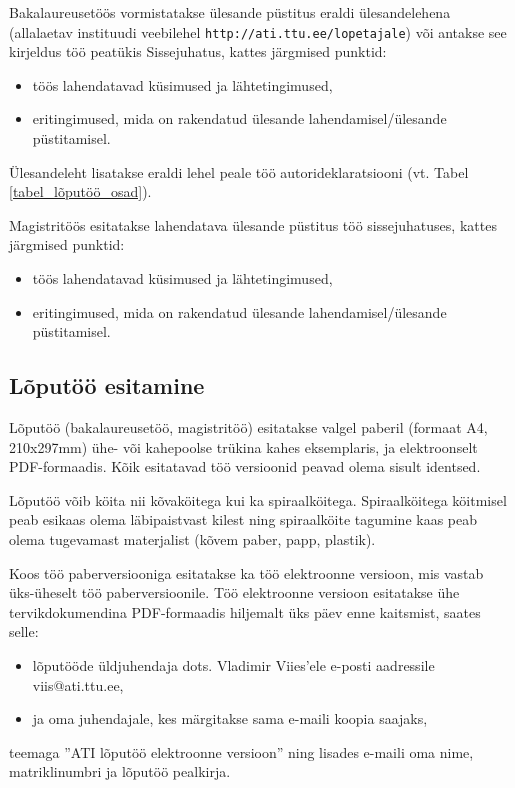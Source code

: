 \documentclass[12pt]{article} %
\begin{document}
Bakalaureusetöös vormistatakse ülesande püstitus eraldi ülesandelehena (allalaetav instituudi veebilehel \texttt{http://ati.ttu.ee/lopetajale}) või antakse see kirjeldus töö peatükis Sissejuhatus, kattes järgmised punktid: 
\begin{itemize}
\item töös lahendatavad küsimused ja lähtetingimused,
\item eritingimused, mida on rakendatud ülesande lahendamisel/ülesande püstitamisel.
\end{itemize}

Ülesandeleht lisatakse eraldi lehel peale töö autorideklaratsiooni (vt. Tabel \ref{tabel_lõputöö_osad}).

Magistritöös esitatakse lahendatava ülesande püstitus töö sissejuhatuses, kattes järgmised punktid: 
\begin{itemize}
\item töös lahendatavad küsimused ja lähtetingimused, 
\item eritingimused, mida on rakendatud ülesande lahendamisel/ülesande püstitamisel.
\end{itemize}

\subsection{Lõputöö esitamine}
\label{Lõputöö esitamine} %
Lõputöö (bakalaureusetöö, magistritöö) esitatakse valgel paberil (formaat A4, 210x297mm) ühe- või kahepoolse trükina kahes eksemplaris, ja elektroonselt PDF-formaadis. Kõik esitatavad töö versioonid peavad olema sisult identsed.

Lõputöö võib köita nii kõvaköitega kui ka spiraalköitega. Spiraalköitega köitmisel peab esikaas olema läbipaistvast kilest ning spiraalköite tagumine kaas peab olema tugevamast materjalist (kõvem paber, papp, plastik).

Koos töö paberversiooniga esitatakse ka töö elektroonne versioon, mis vastab üks-üheselt töö paberversioonile. Töö elektroonne versioon esitatakse ühe tervikdokumendina PDF-formaadis hiljemalt üks päev enne kaitsmist, saates selle: 
\begin{itemize}
\item lõputööde üldjuhendaja dots. Vladimir Viies'ele e-posti aadressile viis@ati.ttu.ee, 
\item ja oma juhendajale, kes märgitakse sama e-maili koopia saajaks,
\end{itemize}
teemaga ''ATI lõputöö elektroonne versioon'' ning lisades e-maili oma nime, matriklinumbri ja lõputöö pealkirja.
\end{document}
